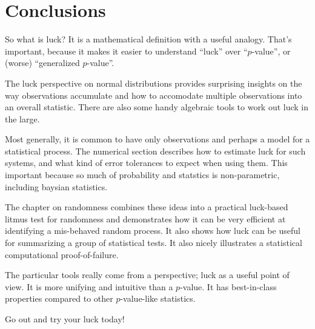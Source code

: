 \chapter{Conclusions}

So what is luck?  It is a mathematical definition with a useful analogy.  That's important, because it makes it easier to understand ``luck'' over ``$p$-value'', or (worse) ``generalized $p$-value''.  

The luck perspective on normal distributions provides surprising insights on the way observations accumulate and how to accomodate multiple observations into an overall statistic.  There are also some handy algebraic tools to work out luck in the large.

Most generally, it is common to have only observations and perhaps a model for a statistical process.  The numerical section describes how to estimate luck for such systems, and what kind of error tolerances to expect when using them.  This important because so much of probability and statstics is non-parametric, including baysian statistics.

The chapter on randomness combines these ideas into a practical luck-based litmus test for randomness and demonstrates how it can be very efficient at identifying a mis-behaved random process.  It also shows how luck can be useful for summarizing a group of statistical tests.  It also nicely illustrates a statistical computational proof-of-failure.

The particular tools really come from a perspective; luck as a useful point of view.  It is more unifying and intuitive than a $p$-value.  It has best-in-class properties compared to other $p$-value-like statistics.  

Go out and try your luck today!

